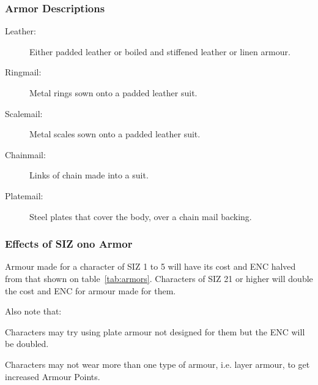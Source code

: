 \subsubsection{Armor Descriptions}
\begin{description}
	\item[Leather:] Either padded leather or boiled and stiffened leather or linen armour.
	\item[Ringmail:] Metal rings sown onto a padded leather suit.
	\item[Scalemail:] Metal scales sown onto a padded leather suit.
	\item[Chainmail:] Links of chain made into a suit.
	\item[Platemail:] Steel plates that cover the body, over a chain mail backing.
\end{description}

\subsubsection{Effects of SIZ ono Armor}
Armour made for a character of SIZ 1 to 5 will have its cost and ENC halved from that shown on table~\ref{tab:armors}. Characters of SIZ 21 or higher will double the cost and ENC for armour made for them.

Also note that:
\begin{rpg-list}
	\item Characters may try using plate armour not designed for them but the ENC will be doubled. 
	\item Characters may not wear more than one type of armour, i.e. layer armour, to get increased Armour Points. 
\end{rpg-list}

